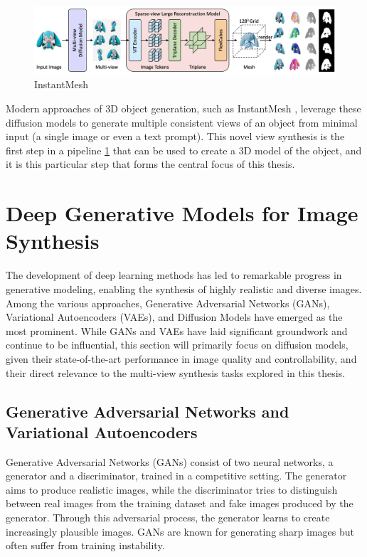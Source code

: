 \begin{figure}[h]
  \centering
  \includegraphics[width=\textwidth]{images/related-work/instantmesh.png}
  \caption{InstantMesh}
  \label{fig:instantmesh}
\end{figure}

Modern approaches of 3D object generation, such as InstantMesh \cite{instantmesh}, leverage these diffusion models to generate multiple consistent views of an object from minimal input (a single image or even a text prompt). This novel view synthesis is the first step in a pipeline \ref{fig:instantmesh} that can be used to create a 3D model of the object, and it is this particular step that forms the central focus of this thesis.

\section{Deep Generative Models for Image Synthesis}\label{sec:text-to-image}

The development of deep learning methods has led to remarkable progress in generative modeling, enabling the synthesis of highly realistic and diverse images. Among the various approaches, Generative Adversarial Networks (GANs), Variational Autoencoders (VAEs), and Diffusion Models have emerged as the most prominent. While GANs and VAEs have laid significant groundwork and continue to be influential, this section will primarily focus on diffusion models, given their state-of-the-art performance in image quality and controllability, and their direct relevance to the multi-view synthesis tasks explored in this thesis.

\subsection{Generative Adversarial Networks and Variational Autoencoders}

Generative Adversarial Networks (GANs) \cite{gan} consist of two neural networks, a generator and a discriminator, trained in a competitive setting. The generator aims to produce realistic images, while the discriminator tries to distinguish between real images from the training dataset and fake images produced by the generator. Through this adversarial process, the generator learns to create increasingly plausible images. GANs are known for generating sharp images but often suffer from training instability.

